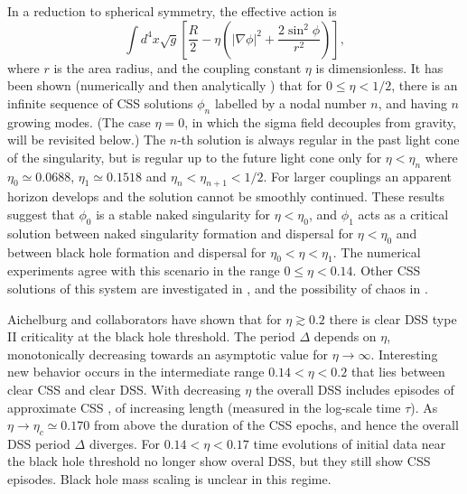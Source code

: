 \documentclass{article}
\begin{document}
In a reduction to spherical symmetry, the effective action is
\begin{equation}
\int d^4x \sqrt{g} \left[\frac{R}{2}- \eta
\left( |\nabla\phi|^2 + \frac{2\sin^2\phi}{r^2} \right)\right],
\end{equation}
where $r$ is the area radius, and the coupling constant $\eta$ is
dimensionless.
It has been shown (numerically \cite{BizonWassermann} and then
analytically \cite{BizonWassermann2}) that for $0\le\eta<1/2$,
there is an infinite sequence of CSS solutions $\phi_n$ labelled by
a nodal number $n$, and having $n$ growing modes. (The case $\eta=0$,
in which the sigma field decouples from gravity, will be revisited
below.)
The $n$-th solution is always regular in the past light cone of the
singularity, but is regular up to the future light cone only for
$\eta<\eta_n$ where $\eta_0\simeq 0.0688$, $\eta_1\simeq 0.1518$ and
$\eta_n<\eta_{n+1}<1/2$. For larger couplings an apparent horizon
develops and the solution cannot be smoothly continued.
These results suggest that $\phi_0$ is a stable naked singularity
for $\eta<\eta_0$, and $\phi_1$ acts as a critical solution between
naked singularity formation and dispersal for $\eta<\eta_0$ and between
black hole formation and dispersal for $\eta_0<\eta<\eta_1$.
The numerical experiments agree with this scenario in the range
$0\le\eta < 0.14$. Other CSS solutions of this system are investigated
in \cite{BizonSzybkaWassermann}, and the possibility of chaos in
\cite{Szybka}. 

Aichelburg and collaborators \cite{Aichelburg1,LechnerPhD} have shown
that for $\eta\gtrsim 0.2$ there is clear DSS type II criticality
at the black hole threshold. The period $\Delta$ depends on
$\eta$, monotonically decreasing towards an asymptotic value for
$\eta\to\infty$.
Interesting new behavior occurs in the intermediate range
$0.14<\eta<0.2$ that lies between clear CSS and clear DSS.
With decreasing $\eta$ the overall DSS includes episodes of
approximate CSS \cite{Aichelburg2}, of increasing length
(measured in the log-scale time $\tau$). As $\eta\to\eta_c\simeq
0.170$ from above the duration of the CSS epochs, and hence the
overall DSS period $\Delta$ diverges. For $0.14<\eta<0.17$ time
evolutions of initial data near the black hole threshold no longer
show overal DSS, but they still show CSS episodes. Black hole mass
scaling is unclear in this regime.
\end{document}
